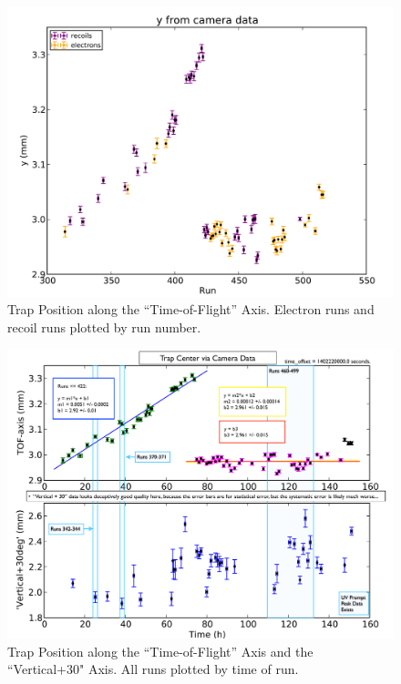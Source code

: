 \begin{figure}[h!!t]
	\centering
	\includegraphics[width=.999\linewidth]
	{Figures/y_from_camera_electron_recoil.pdf}
	\caption[Trap Position along TOF Axis]{Trap Position along the ``Time-of-Flight'' Axis.  Electron runs and recoil runs plotted by run number.  }	
	\label{fig:camera_electron_recoil}
\end{figure}

\begin{figure}[h!!t]
	\centering
	\includegraphics[width=.999\linewidth]
	{Figures/TrapPosition_FromCamera.pdf}
	\caption[Trap Position from Camera]{Trap Position along the ``Time-of-Flight'' Axis and the ``Vertical+30" Axis.  All runs plotted by time of run. }	
	\label{fig:cameraposition_by_time}
\end{figure}




